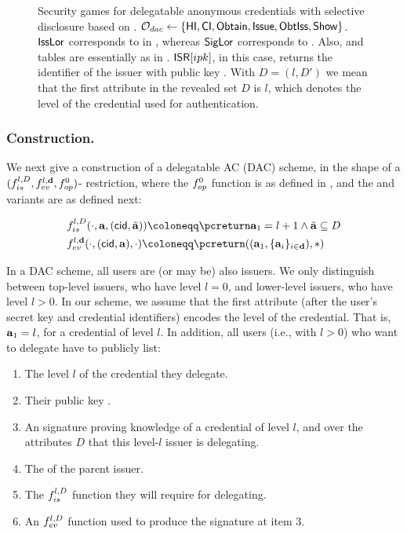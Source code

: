 \begin{figure}[ht!]
{  }
  \caption{Security games for delegatable anonymous credentials with selective
    disclosure based on \cite{fhs19}. $\mathcal{O}_{dac} \gets \lbrace
    \mathsf{HI},\mathsf{CI},\mathsf{Obtain},\mathsf{Issue},\mathsf{ObtIss},
    \mathsf{Show}\rbrace$. $\mathsf{IssLor}$ corresponds to \OBTCHALb in \UAS,
    whereas $\mathsf{SigLor}$ corresponds to \CHALb. Also, \OWNR
    and \ATTR tables are essentially as in .
    $\mathsf{ISR}[ipk]$, in this case, returns the identifier of the issuer with public
    key \ipk. With $D = (l,D')$ we mean that the first attribute in the revealed
    set $D$ is $l$, which denotes the level of the credential used for
    authentication.}
  \label{fig:model-dac}  
\end{figure}

\subsubsection{\CUASDAC Construction.} %
We next give a construction of a delegatable AC (DAC) scheme, in the shape of
a $(f_{is}^{l,D},f_{ev}^{l,\mathbf{d}},f_{op}^0)$-\CUASGenInt
restriction, where the $f_{op}^0$ function is as defined in
, and the \fissue and \feval variants are as
defined next:

\begin{align}
  & \fissue^{l,D}(\cdot,\attrs,(\cid,\cattrs)) \coloneqq
    \pcreturn \attrs_1 = l+1 \land \cattrs \subseteq D \nonumber \\
  & \feval^{l,\dattrs}(\cdot,(\cid,\attrs),\cdot) \coloneqq
    \pcreturn((\attrs_1,\lbrace\attrs_i\rbrace_{i\in\dattrs}),\ast)
    \label{eq:funcs-dac}
\end{align}

In a DAC scheme, all users are (or may be) also issuers. We only
distinguish between top-level issuers, who have level $l=0$, and lower-level
issuers, who have level $l>0$. In our \CUASDAC scheme, we assume that the first
attribute (after the user's secret key and credential identifiers) encodes the
level of the credential. That is, $\mathbf{a}_1=l$, for a credential of level $l$.
In addition, all users (i.e., with $l>0$) who want to delegate have to publicly
list:

\begin{enumerate}
\item The level $l$ of the credential they delegate.
\item Their public key \ipk.
\item An \UAS signature proving knowledge of a credential of level $l$, and over
  the attributes $D$ that this level-$l$ issuer is delegating.
\item The \ipk of the parent issuer.
\item The $f_{is}^{l,D}$ function they will require for delegating.
\item An $f_{ev}^{l,D}$ function used to produce the signature at item 3.
\end{enumerate}

